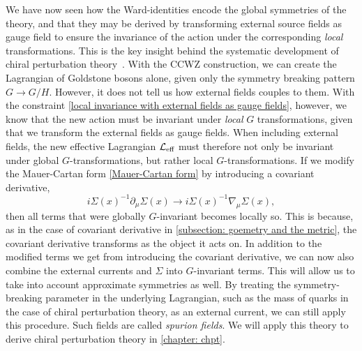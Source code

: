 We have now seen how the Ward-identities encode the global symmetries of the theory, and that they may be derived by transforming external source fields as gauge field to ensure the invariance of the action under the corresponding \emph{local} transformations.
This is the key insight behind the systematic development of chiral perturbation theory~\autocite{gasserChiralPerturbationTheory1984,gasserChiralPerturbationTheory1985,leutwylerFoundationsChiralPerturbation1994}.
With the CCWZ construction, we can create the Lagrangian of Goldstone bosons alone, given only the symmetry breaking pattern $G \rightarrow G/H$.
However, it does not tell us how external fields couples to them.
With the constraint \autoref{local invariance with external fields as gauge fields}, however, we know that the new action must be invariant under \emph{local} $G$ transformations, given that we transform the external fields as gauge fields.
When including external fields, the new effective Lagrangian $\mathcal{L}_\text{eff}$ must therefore not only be invariant under global $G$-transformations, but rather local $G$-transformations.
If we modify the Mauer-Cartan form \autoref{Mauer-Cartan form} by introducing a covariant derivative,
%
\begin{equation}
    i\Sigma(x)^{-1} \partial_\mu \Sigma(x)
    \rightarrow i\Sigma(x)^{-1} \nabla_\mu \Sigma(x),
\end{equation}
%
then all terms that were globally $G$-invariant becomes locally so.
This is because, as in the case of covariant derivative in \autoref{subsection: goemetry and the metric}, the covariant derivative transforms as the object it acts on.
In addition to the modified terms we get from introducing the covariant derivative, we can now also combine the external currents and $\Sigma$ into $G$-invariant terms.
This will allow us to take into account approximate symmetries as well.
By treating the symmetry-breaking parameter in the underlying Lagrangian, such as the mass of quarks in the case of chiral perturbation theory, as an external current, we can still apply this procedure.
Such fields are called \emph{spurion fields}.
We will apply this theory to derive chiral perturbation theory in \autoref{chapter: chpt}.

